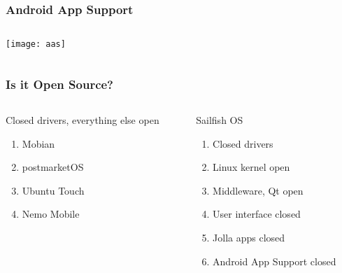\documentclass[
	notes=none,
	aspectratio=169
]{beamer}
\begin{document}
\begin{frame}
\frametitle{Android App Support}

\begin{columns}[T]
\begin{column}[T]{1.0\textwidth}
\setlength{\parskip}{0.5em}

\begin{column}[T]{1.0\textwidth}

\vspace{0.5cm}
\texttt{[image: aas]}

\end{column}

\end{column}
\end{columns}

\end{frame}
\note{
}


\begin{frame}
\frametitle{Is it Open Source?}

\begin{columns}[T]
\begin{column}[T]{0.5\textwidth}
\setlength{\parskip}{0.5em}

\vspace{0.4cm}
Closed drivers, everything else open
\begin{enumerate}
\setlength{\parskip}{0.5em}
\item Mobian
\item postmarketOS
\item Ubuntu Touch
\item Nemo Mobile
\end{enumerate}

\end{column}
\begin{column}[T]{0.5\textwidth}
\setlength{\parskip}{0.5em}

\vspace{0.4cm}
Sailfish OS
\begin{enumerate}
\setlength{\parskip}{0.5em}
\item Closed drivers
\item Linux kernel open
\item Middleware, Qt open
\item User interface closed
\item Jolla apps closed
\item Android App Support closed
\end{enumerate}

\end{column}
\end{columns}

\end{frame}
\note{
}
\end{document}
